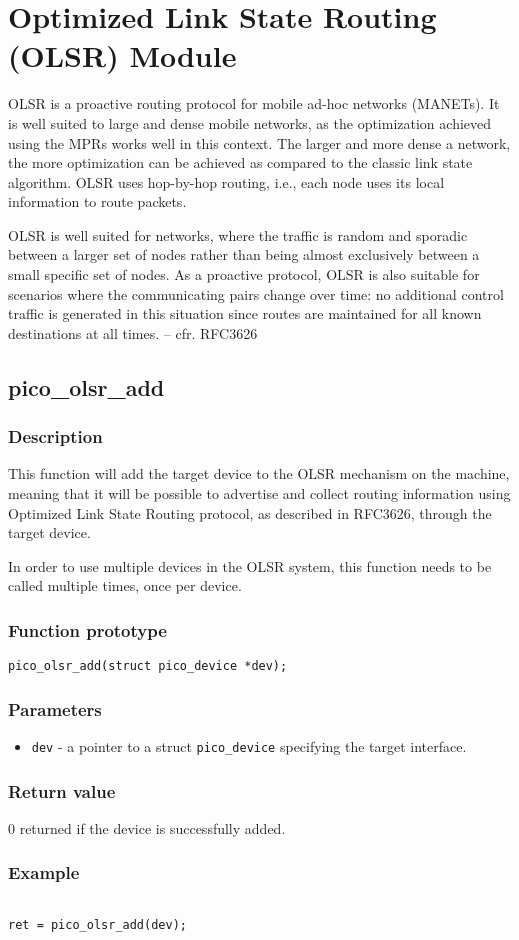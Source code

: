 \section{Optimized Link State Routing (OLSR) Module}


OLSR is a proactive routing protocol for mobile ad-hoc networks
(MANETs).  It is well suited to large and dense mobile
networks, as the optimization achieved using the MPRs works well in
this context.  The larger and more dense a network, the more
optimization can be achieved as compared to the classic link state
algorithm.  OLSR uses hop-by-hop routing, i.e., each node uses its
local information to route packets.

OLSR is well suited for networks, where the traffic is random and
sporadic between a larger set of nodes rather than being almost
exclusively between a small specific set of nodes.  As a proactive
protocol, OLSR is also suitable for scenarios where the communicating
pairs change over time: no additional control traffic is generated in
this situation since routes are maintained for all known destinations
at all times. -- cfr. RFC3626


\subsection{pico\_olsr\_add}

\subsubsection*{Description}
This function will add the target device to the OLSR mechanism on the machine, 
meaning that it will be possible to advertise and collect routing information 
using Optimized Link State Routing protocol, as described in RFC3626, through the
target device.

In order to use multiple devices in the OLSR system, this function needs to be called
multiple times, once per device.

\subsubsection*{Function prototype}
\texttt{pico\_olsr\_add(struct pico\_device *dev);}

\subsubsection*{Parameters}
\begin{itemize}[noitemsep]
\item \texttt{dev} - a pointer to a struct \texttt{pico\_device} specifying the target interface.
\end{itemize}

\subsubsection*{Return value}
0 returned if the device is successfully added.

\subsubsection*{Example}
\begin{verbatim}

ret = pico_olsr_add(dev);

\end{verbatim}

